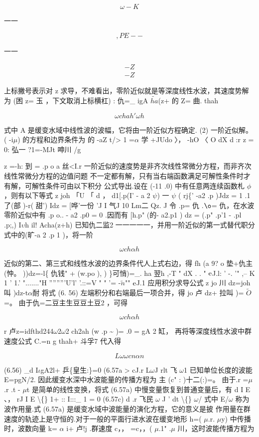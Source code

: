 \[\omega -K\]

一一

\[,PE --\]

一一

\begin{gather*}
-Z\\
-Z
\end{gather*}

上标撇号表示对 z 求导，不难看出，零阶近似就是等深度线性水波，其速度势解为 (困 z= 玉 ，下文取消上标横杠) : 仇=\_ igA $\tilde{ha}$(z+ 的 Z= 曲. thah

\begin{equation*}\omega chah '\omega h\tag{6.55}\end{equation*}

式中 A 是缓变水域中线性波的波幅，它将由一阶近似方程确定. (2) 一阶近似解。( -i$\mu$) 的方程和边界条件为 的 -aZ t/> 1 =$\alpha$ 学 +JUdo 〉， -hO 〈 O dX d :r z = 0: 弘一 ?1=-MJt 呻川 /g

z =-h: 到 = .p o a 丝<I.r 一阶近似的速度势是非齐次线性常微分方程，而非齐次线性常微分方程的边值问题 不一定都有解，只有当右端函数满足可解性条件时才有解，可解性条件可由以下积分 公式导出.设在 (-11 .0) 中有任意两连续函数札 $\phi$ ，则有以下等式 z joh 「U 「 d ， d1[.p(I' - a 2 $\psi$) 一 $\psi$ ( rj\{' -a2 .p )Jdz = 1 .1 了(部 )-r( 甜') Idz = [哗'一份 'J I 气J 10 Lm二 Qz. J 令 .p= 仇 .${\rm ø}$= 仇，在水波零阶近似中有 .p o.. - a2 .p0 = 0 .因而有 [h.p" (的- a2.p1 ) dz = (.p" .p'1 - .pl .p;,) I$\upsilon$h il! Acha(z+h) 已知仇二监2 一一一一一，并用一阶近似的第一式替代职分式中的(旷-a 2 .p 1 )，将一阶

\[\omega ch\alpha h\]

近似的第二、第三式和线性水波的边界条件代人上式右边，得 fh (a 9? o 垫+仇主(忡。 ))dz=-l\{ 仇钱" + (w.po ), ) \}可悄)=\_. ha 翌h ,-T " dX . . " ${\rm e}$J.l: ' -. '" ,-- K 1 ' 1.' "......."H '''''''''U'l' '.::=V " " '= -$\tilde{n}$"" ${\rm e}$J.1 应用积分求导公式 z jo 川 dz=joh 叫 )dz-t$\alpha$耐 将式 (6. 56) 左端积分和右端最后一项合并，得 jo 卢 dz+ 拉叫 )= $\tilde{O}$ =。 由于仇=二豆主生豆豆土豆2 ，可得

\[\omega ch\alpha h\]

r 卢z=idfthd244$\omega$2$\omega$2 ch2ah (w .p \textasciitilde{} )= .0 = gA 2 缸， 再将等深度线性水波中群速度公式 C.=n g thah+ 斗孚7 代入得

\[L\omega \omega cn\alpha n\]

(6.56) \_d I$\iota$gA2l+ 乒\{皇生:\}=0 (6.57a > cJ.r L$\omega$J rlt 飞 $\omega$1 已知单位长度的波能 E=pgN/2. 因此缓变水深中水波能量的传播方程为 主 (c" : )十二(:)=。 由于.r =$\mu$.r .t - $\mu$t 是简单的线性变换，将式 (6.57a) 中慢变量恢复到普通变量后，有 d I E 、， rJ I E \textbackslash\{\} 1+ :: I:::\_ 1 = 0 (6.57c) d .r 飞民 $\omega$ J ' dt \textbackslash\{\} $\omega$/ 式中 E/$\omega$ 称为波作用量.式 (6.57a) 是缓变水域中波能量的演化方程，它的意义是披 作用量在群速度的轨迹上是守恒的.对于一般的平面行进水波在缓变地形 h=( $\mu$.r. $\mu$y) 中传播时，波数向量 k= $\alpha$ i+ 卢!j .群速度 c，， =c，，( $\mu$.1" .$\mu$ 川，这时波能传播方程为

